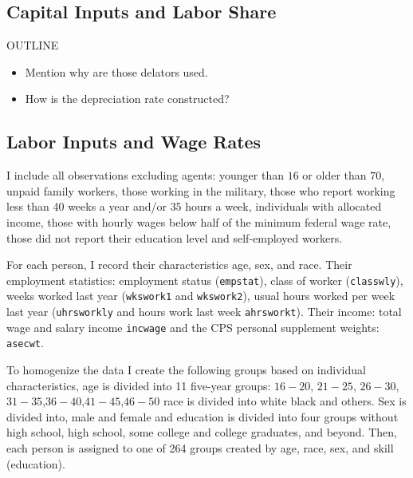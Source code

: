 \documentclass[12pt]{article}
\begin{document}
\subsection{Capital Inputs and Labor Share}\label{subsec:capital-inputs-labor-share}
OUTLINE
\begin{itemize}
 \item Mention why are those delators used.
 \item How is the depreciation rate constructed?
\end{itemize}


\subsection{Labor Inputs and Wage Rates}\label{subsec:labor-inputs-wage-rates}
I include all observations excluding agents: younger than $16$ or older than $70$, unpaid family workers, those working in the military, those who report working less than $40$ weeks a year and/or $35$ hours a week, individuals with allocated income, those with hourly wages below half of the minimum federal wage rate, those did not report their education level and self-employed workers.

For each person, I record their characteristics age, sex, and race. Their employment statistics: employment status (\texttt{empstat}), class of worker (\texttt{classwly}), weeks worked last year (\texttt{wkswork1} and \texttt{wkswork2}), usual hours worked per week last year (\texttt{uhrsworkly} and hours work last week \texttt{ahrsworkt}). Their income: total wage and salary income \texttt{incwage} and the CPS personal supplement weights: \texttt{asecwt}.

To homogenize the data I create the following groups based on individual characteristics, age is divided into 11 five-year groups: $16-20$, $21-25$, $26-30$, $31-35$,$36-40$,$41-45$,$46-50$ race is divided into white black and others. Sex is divided into, male and female and education is divided into four groups without high school, high school, some college and college graduates, and beyond. Then, each person is assigned to one of 264 groups created by age, race, sex, and skill (education).
\end{document}
